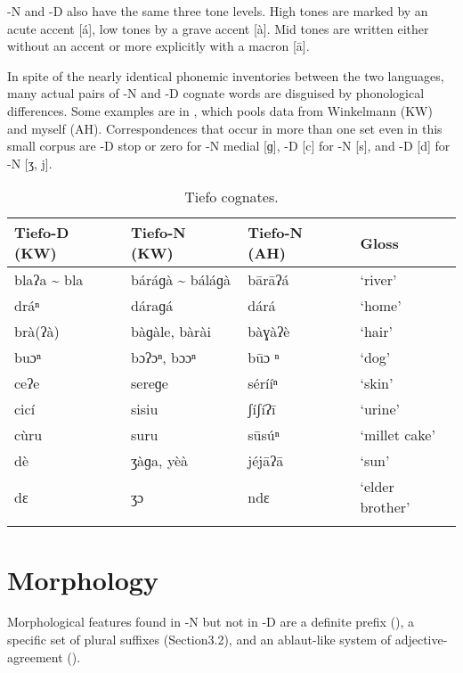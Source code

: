 \documentclass[output=paper,
modfonts
]{langscibook}
\begin{document}
-N and -D also have the same three tone levels. High tones are marked by an acute accent [á], low tones by a grave accent [à]. Mid tones are written either without an accent \citep{Winkelmann1998} or more explicitly with a macron [ā].

In spite of the nearly identical phonemic inventories between the two languages, many actual pairs of -N and -D cognate words are disguised by phonological differences. Some examples are in , which pools data from Winkelmann (KW) and myself (AH). Correspondences that occur in more than one set even in this small corpus are -D  stop or zero for -N medial [ɡ], -D [c] for -N [s], and -D [d] for -N [ʒ, j].

\begin{table}
\caption{Tiefo cognates.}
\label{tab:hangtan:2}
\begin{tabularx}{\textwidth}{XXXX}
\lsptoprule
{\bfseries  {Tiefo}-D (KW)} & {\bfseries  {Tiefo}-N (KW)} & {\bfseries  {Tiefo}-N (AH)} & {\bfseries Gloss}\\
\midrule 
{ blaʔa {\textasciitilde} bla} & { báráɡà {\textasciitilde} báláɡà} & { bārāʔá} & { ‘river’}\\
{ dráⁿ} & { dáraɡá} & { dárá} & { ‘home’}\\
{ brà(ʔà)} & { bàɡàle, bàrài} & { bàɣàʔè} & { ‘hair’}\\
{ buɔⁿ} & { bɔʔɔⁿ, bɔɔⁿ} & { būɔ ⁿ} & { ‘dog’}\\
{ ceʔe} & { sereɡe} & { sérííⁿ} & { ‘skin’}\\
{ cicí} & { sisiu} & { ʃíʃíʔī} & { ‘urine’}\\
{ cùru} & { suru} & { sūsúⁿ} & { ‘millet cake’}\\
{ dè} & { ʒàɡa, yèà} & { jéjāʔā} & { ‘sun’}\\
{ dɛ} & { ʒɔ} & { ndɛ} & { ‘elder brother’}\\
\lspbottomrule
\end{tabularx}


\end{table}

\section{Morphology}\label{sec:hangtan:3}

Morphological features found in -N but not in -D are a definite prefix (), a specific set of plural suffixes (Section3.2), and an ablaut-like system of adjective- agreement ().
\end{document}
